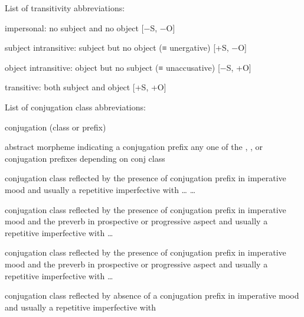\vspace{\baselineskip}
\noindent
List of transitivity abbreviations:
\begin{description}[font={\normalfont}, style=sameline, labelindent=\parindent, labelwidth=4em, leftmargin=!]
\item[impers]		impersonal: no subject and no object
			\hfill{}[−S, −O]
\item[subj intr]	subject intransitive: subject but no object (≡ unergative)
			\hfill{}[+S, −O]
\item[obj intr]		object intransitive: object but no subject (≡ unaccusative)
			\hfill{}[−S, +O]
\item[tr]		transitive: both subject and object
			\hfill{}[+S, +O]
\end{description}

\vspace{\baselineskip}
\noindent
List of conjugation class abbreviations:
\begin{description}[font={\normalfont}, style=sameline, labelindent=\parindent, labelwidth=3em, leftmargin=!]
\item[conj]	conjugation (class or prefix)
\item[\fm{\xx{cnj}-}]
		abstract morpheme indicating a conjugation prefix\newline
		any one of the , , or  conjugation prefixes
			depending on conj class
\item[\fm{n}]	 conjugation class\newline
		reflected by the presence of  conjugation prefix in imperative mood\newline
		and usually a repetitive imperfective with  …  … 
\item[\fm{g̱}]	 conjugation class\newline
		reflected by the presence of  conjugation prefix in imperative mood\newline
		and the  preverb in prospective or progressive aspect\newline
		and usually a repetitive imperfective with  … 
\item[\fm{g}]	 conjugation class\newline
		reflected by the presence of  conjugation prefix in imperative mood\newline
		and the  preverb in prospective or progressive aspect
		and usually a repetitive imperfective with  … 
\item[\fm{∅}]	 conjugation class\newline
		reflected by absence of a conjugation prefix in imperative mood\newline
		and usually a repetitive imperfective with 
\end{description}

